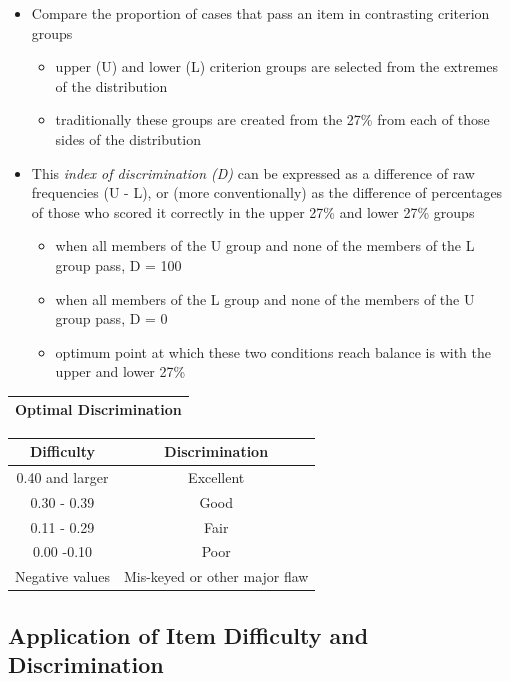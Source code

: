 \documentclass[
  english,
]{book}
\providecommand{\tightlist}{%
  \setlength{\itemsep}{0pt}\setlength{\parskip}{0pt}}
\begin{document}
\begin{itemize}
\tightlist
\item
  Compare the proportion of cases that pass an item in contrasting criterion groups

  \begin{itemize}
  \tightlist
  \item
    upper (U) and lower (L) criterion groups are selected from the extremes of the distribution
  \item
    traditionally these groups are created from the 27\% from each of those sides of the distribution
  \end{itemize}
\item
  This \emph{index of discrimination (D)} can be expressed as a difference of raw frequencies (U - L), or (more conventionally) as the difference of percentages of those who scored it correctly in the upper 27\% and lower 27\% groups

  \begin{itemize}
  \tightlist
  \item
    when all members of the U group and none of the members of the L group pass, D = 100
  \item
    when all members of the L group and none of the members of the U group pass, D = 0
  \item
    optimum point at which these two conditions reach balance is with the upper and lower 27\%
  \end{itemize}
\end{itemize}

\begin{longtable}[]{@{}l@{}}
\toprule
Optimal Discrimination\tabularnewline
\midrule
\endhead
\bottomrule
\end{longtable}

\begin{longtable}[]{@{}cc@{}}
\toprule
Difficulty & Discrimination\tabularnewline
\midrule
\endhead
0.40 and larger & Excellent\tabularnewline
0.30 - 0.39 & Good\tabularnewline
0.11 - 0.29 & Fair\tabularnewline
0.00 -0.10 & Poor\tabularnewline
Negative values & Mis-keyed or other major flaw\tabularnewline
\bottomrule
\end{longtable}

\hypertarget{application-of-item-difficulty-and-discrimination}{%
\subsection{Application of Item Difficulty and Discrimination}\label{application-of-item-difficulty-and-discrimination}}
\end{document}
